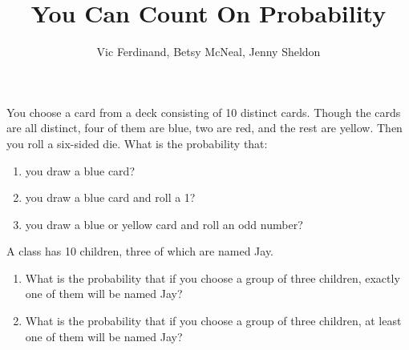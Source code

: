 \documentclass{ximera}
\title{You Can Count On Probability}
\author{Vic Ferdinand, Betsy McNeal, Jenny Sheldon}
\begin{document}
\begin{abstract}
\end{abstract}
\maketitle




\begin{problem}
You choose a card from a deck consisting of 10 distinct cards.  Though the cards are all distinct, four of them are blue, two are red, and the rest are yellow.  Then you roll a six-sided die.  What is the probability that:
\begin{enumerate}
\item you draw a blue card?
\item you draw a blue card and roll a 1?
\item you draw a blue or yellow card and roll an odd number?
\end{enumerate}
\vfill
\end{problem}

\begin{problem}
A class has 10 children, three of which are named Jay.  
\begin{enumerate}
\item What is the probability that if you choose a group of three children, exactly one of them will be named Jay?
\item What is the probability that if you choose a group of three children, at least one of them will be named Jay?
\end{enumerate}
\vfill
\end{problem}
\end{document}
